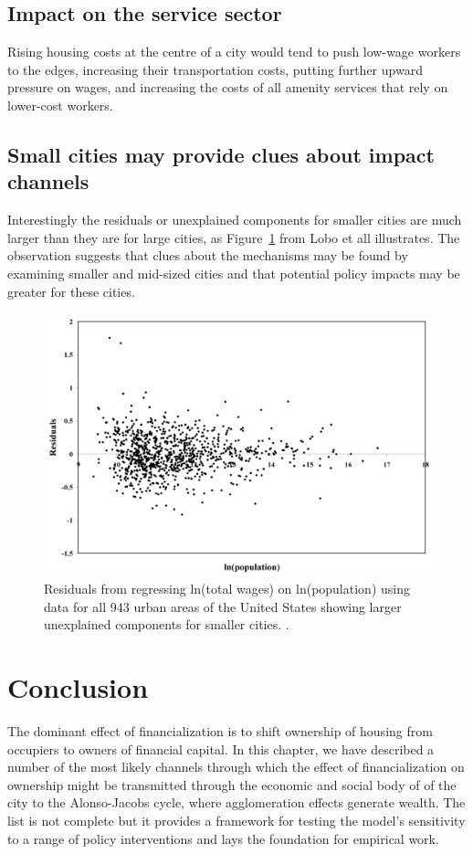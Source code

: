 \subsection{Impact on the service sector}
Rising housing costs at the centre of a city would tend to push low-wage workers to the edges, increasing their transportation costs, putting further upward pressure on wages, and increasing the costs of all amenity services that rely on lower-cost workers.

\subsection{Small cities may provide clues about impact channels }\label{sec-fig-residuals}
Interestingly the residuals or unexplained components for smaller cities are much larger than they are for large cities, as Figure~\ref{fig-residuals-lobo} from Lobo et all \cite{loboUrbanScalingProduction2013} illustrates. The observation suggests that clues about the mechanisms may be found by examining smaller and mid-sized cities and that potential policy impacts may be greater for these cities.

\begin{figure}[h!tb]
\centering
\includegraphics[scale=0.30]{fig/residuals-lobo.png}
\caption{Residuals from regressing ln(total wages) on ln(population) using data for all 943 urban areas of the United States showing larger unexplained components for smaller cities. \cite{loboUrbanScalingProduction2013}.}
\label{fig-residuals-lobo}
\end{figure}



\section{Conclusion}
 The dominant effect of financialization is to shift ownership of housing from occupiers to owners of financial capital. In this chapter, we have described a number of the most likely channels through which the effect of financialization on ownership  might be transmitted through the economic and social body of of the city to the Alonso-Jacobs cycle, where agglomeration effects generate wealth. The list is not complete but it provides a framework for testing the model's sensitivity to a range of policy interventions and lays the foundation for empirical work.  

